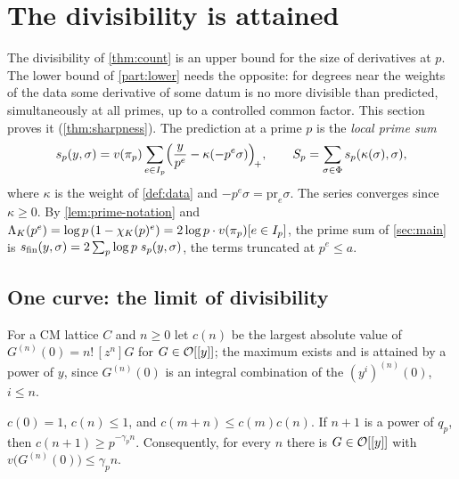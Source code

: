 \section{The divisibility is attained}\label{sec:sharpness}

The divisibility of \cref{thm:count} is an upper bound for the size of derivatives at $p$. The lower
bound of \cref{part:lower} needs the opposite: for degrees near the weights of the data some
derivative of some datum is no more divisible than predicted, simultaneously at all primes, up to a
controlled common factor. This section proves it (\cref{thm:sharpness}). The prediction at a prime
$p$ is the \emph{local prime sum}
\[
  s_p(y,\sigma)=v(\pi_p)\sum_{e\in I_p}\Bigl(\frac y{p^e}-\kappa(-p^e\sigma)\Bigr)_{\!+},\qquad
  S_p=\sum_{\sigma\in\Phi}s_p(\kappa(\sigma),\sigma),
\]
where $\kappa$ is the weight of \cref{def:data} and $-p^e\sigma=\mathrm{pr}_e\sigma$. The series
converges since $\kappa\ge0$. By \cref{lem:prime-notation} and $\Lambda_K(p^e)=\log p\,(1-\chi_K(p)^e)=
2\log p\cdot v(\pi_p)[e\in I_p]$, the prime sum of \cref{sec:main} is
$s_{\mathrm{fin}}(y,\sigma)=2\sum_p\log p\;s_p(y,\sigma)$, the terms truncated at $p^e\le a$.

\subsection{One curve: the limit of divisibility}\label{ss:katz-limit}
For a CM lattice $C$ and $n\ge0$ let $c(n)$ be the largest absolute value of $G^{(n)}(0)=n!\,[z^n]G$
for $G\in\mathcal{O}[[y]]$; the maximum exists and is attained by a power of $y$, since
$G^{(n)}(0)$ is an integral combination of the $(y^i)^{(n)}(0)$, $i\le n$.

\begin{proposition}\label{prop:katz-limit}
$c(0)=1$, $c(n)\le1$, and $c(m+n)\le c(m)c(n)$. If $n+1$ is a power of $q_p$, then
$c(n+1)\ge p^{-\gamma_pn}$. Consequently, for every $n$ there is $G\in\mathcal{O}[[y]]$ with
$v\bigl(G^{(n)}(0)\bigr)\le\gamma_pn$.
\end{proposition}

